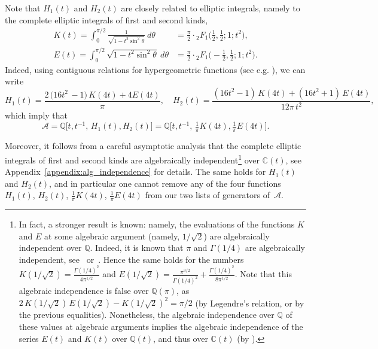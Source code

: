 \documentclass[12pt]{amsart}
\theoremstyle{plain}
\theoremstyle{remark}
\def\Q{\mathbb{Q}}
\def\Q{\mathbb{Q}}
\def\cA{\mathcal{A}}
\begin{document}
Note that $H_1(t)$ and $H_2(t)$ are closely related to elliptic integrals,
namely to the complete elliptic integrals of first and second kinds,
\begin{align*}
K(t) = \int_0^{\pi/2} \frac{1}{\sqrt{1-t^2 \sin^2\theta}} \ d\theta &=
  \frac\pi2 \cdot  {}_{2}^{}{{}{{}{F_{1}^{}}}}\big(\tfrac12, \tfrac12; 1; t^2\big),
    \\
E(t) = \int_0^{\pi/2} {\sqrt{1-t^2 \sin^2\theta}} \ d\theta  &=
  \frac\pi2 \cdot {}_{2}^{}{{}{{}{F_{1}^{}}}}\big(-\tfrac12, \tfrac12; 1; t^2\big) .
\end{align*}
Indeed, using contiguous relations for hypergeometric functions (see e.g. \cite[Section $2.5$]{AAR99}),
we can write
\begin{equation}\label{eq:H12_EK}
H_1(t) = 
\frac{2 \,  \big(16 t^{2}\,-1 \big)\, K \left(4 t \right) + 4 E \left(4 t \right)}{\pi},
\quad
H_2(t)  = 
\frac{\left(16 t^{2}-1\right) \, K \left(4 t \right) + \left(16 t^{2}+1\right) \, E \left(4 t \right)}{12 \pi  \,t^{2}},
\end{equation}
which imply that 
\[
\cA = \Q\Big[t,t^{-1}, \, H_1(t), H_2(t) \Big] = \Q\Big[t,t^{-1}, \, \tfrac1{\pi} K \left(4 t \right), \tfrac1{\pi} E \left(4 t \right) \Big] .
\]


Moreover, it follows from a careful asymptotic analysis that
the complete elliptic integrals of first and second kinds are %
algebraically independent\footnote{\label{fn1} In fact, a stronger result is known: namely, the evaluations of the functions $K$ and $E$
at some algebraic argument (namely, $1/\sqrt{2}$) are algebraically independent over $\Q$.
Indeed, it is known that $\pi$ and $\Gamma(1/4)$ are algebraically independent, see~\cite{Chudnovsky76} or~\cite[Thm.~14]{Waldschmidt06}. 
Hence the same holds for the numbers $K(1/\sqrt{2}) = \frac{\Gamma (1/4)^2}{4\pi^{1/2}}$ and $E(1/\sqrt{2}) = \frac{\pi^{3/2}}{\Gamma(1/4)^2} + \frac{\Gamma(1/4)^2}{8\pi^{1/2}}$. Note that this algebraic independence is false over $\Q(\pi)$, as 
$2 \, K(1/\sqrt{2}) \, E(1/\sqrt{2}) - K(1/\sqrt{2})^2 = \pi/2$ (by Legendre's relation, or by the previous equalities). Nonetheless, the algebraic independence over $\mathbb Q$ of these values at algebraic arguments implies the algebraic independence of the series $E(t)$ and $K(t)$ over $\mathbb Q(t)$, and thus over $\mathbb C(t)$ (by \cite[Lemma 7.2]{ABD19}).} over $\mathbb C(t)$, see Appendix~\ref{appendix:alg_independence} for details.
The same holds for $H_1(t)$ and $H_2(t)$, and in particular 
one cannot remove any of the four functions $H_1(t)$, $H_2(t)$, $\tfrac1{\pi}K \left(4 t \right)$, $\tfrac1{\pi}E \left(4 t \right)$ from our two lists of generators of~$\cA$.
\end{document}
